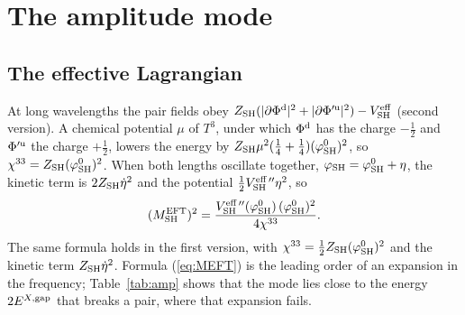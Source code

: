 \documentclass[aps,prd,onecolumn,superscriptaddress,nofootinbib,floatfix,longbibliography]{revtex4-2}
\newcommand{\SH}{{\rm SH}}
\begin{document}
\section{The amplitude mode}
\label{sec:amplitude}

\subsection{The effective Lagrangian}

At long wavelengths the pair fields obey $Z_\SH(|\partial\Phi^{\rm d}|^2+|\partial\Phi'^{\rm u}|^2)-V^{\rm eff}_\SH$ (second
version). A chemical potential $\mu$ of $T^3$, under which $\Phi^{\rm d}$ has the charge $-\frac12$ and $\Phi'^{\rm u}$ the
charge $+\frac12$, lowers the energy by $Z_\SH\mu^2(\frac14+\frac14)(\varphi^0_\SH)^2$, so $\chi^{33}=Z_\SH(\varphi^0_\SH)^2$.
When both lengths oscillate together, $\varphi_\SH=\varphi^0_\SH+\eta$, the kinetic term is $2Z_\SH\dot\eta^2$ and the potential
$\frac12V^{\rm eff\,\prime\prime}_\SH\eta^2$, so
\begin{equation}
(M^{\rm EFT}_\SH)^2=\frac{V^{\rm eff\,\prime\prime}_\SH(\varphi^0_\SH)\,(\varphi^0_\SH)^2}{4\chi^{33}} .
\label{eq:MEFT}
\end{equation}
The same formula holds in the first version, with $\chi^{33}=\frac12Z_\SH(\varphi^0_\SH)^2$ and the kinetic term
$Z_\SH\dot\eta^2$. Formula (\ref{eq:MEFT}) is the leading order of an expansion in the frequency; Table~\ref{tab:amp} shows that
the mode lies close to the energy $2E^{X,{\rm gap}}$ that breaks a pair, where that expansion fails.
\end{document}
